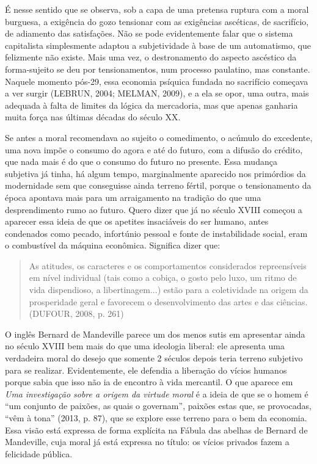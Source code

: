É nesse sentido que se observa, sob a capa de uma pretensa ruptura com a
moral burguesa, a exigência do gozo tensionar com as exigências
ascéticas, de sacrifício, de adiamento das satisfações. Não se pode
evidentemente falar que o sistema capitalista simplesmente adaptou a
subjetividade à base de um automatismo, que felizmente não existe. Mais
uma vez, o destronamento do aspecto ascéstico da forma-sujeito se deu
por tensionamentos, num processo paulatino, mas constante. Naquele
momento pós-29, essa economia psíquica fundada no sacrifício começava a
ver surgir (LEBRUN, 2004; MELMAN, 2009), e a ela se opor, uma outra,
mais adequada à falta de limites da lógica da mercadoria, mas que apenas
ganharia muita força nas últimas décadas do século XX.

Se antes a moral recomendava ao sujeito o comedimento, o acúmulo do
excedente, uma nova impõe o consumo do agora e até do futuro, com a
difusão do crédito, que nada mais é do que o consumo do futuro no
presente. Essa mudança subjetiva já tinha, há algum tempo, marginalmente
aparecido nos primórdios da modernidade sem que conseguisse ainda
terreno fértil, porque o tensionamento da época apontava mais para um
arraigamento na tradição do que uma desprendimento rumo ao futuro. Quero
dizer que já no século XVIII começou a aparecer essa ideia de que os
apetites insaciáveis do ser humano, antes condenados como pecado,
infortúnio pessoal e fonte de instabilidade social, eram o combustível
da máquina econômica. Significa dizer que:

\begin{quote}
As atitudes, os caracteres e os comportamentos considerados
repreensíveis em nível individual (tais como a cobiça, o gosto pelo
luxo, um ritmo de vida dispendioso, a libertinagem...) estão para a
coletividade na origem da prosperidade geral e favorecem o
desenvolvimento das artes e das ciências. (DUFOUR, 2008, p. 261)
\end{quote}

O inglês Bernard de Mandeville parece um dos menos sutis em apresentar
ainda no século XVIII bem mais do que uma ideologia liberal: ele
apresenta uma verdadeira moral do desejo que somente 2 séculos depois
teria terreno subjetivo para se realizar. Evidentemente, ele defendia a
liberação do vícios humanos porque sabia que isso não ia de encontro à
vida mercantil. O que aparece em \emph{Uma} \emph{investigação sobre a
origem da virtude moral} é a ideia de que se o homem é ``um conjunto de
paixões, as quais o governam'', paixões estas que, se provocadas, ``vêm
à tona'' (2013, p. 87), que se explore esse terreno para o bem da
economia. Essa visão está expressa de forma explícita na Fábula das
abelhas de Bernard de Mandeville, cuja moral já está expressa no título:
os vícios privados fazem a felicidade pública.

